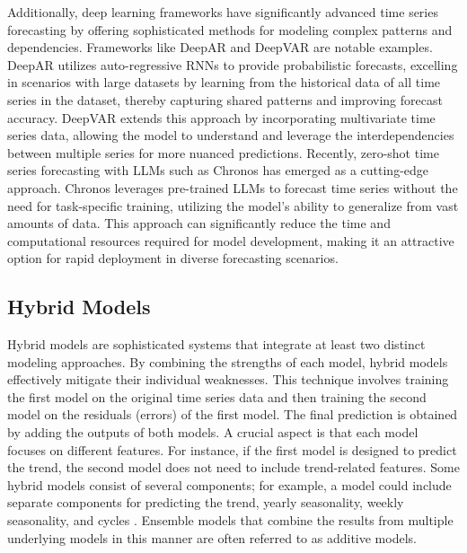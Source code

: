 Additionally, deep learning frameworks have significantly advanced time series
forecasting by offering sophisticated methods for modeling complex patterns and
dependencies. Frameworks like DeepAR \parencite{salinas2020deepar} and DeepVAR
\parencite{cheng2020deepvar} are notable examples. DeepAR utilizes auto-regressive
\ac{RNNs} to provide probabilistic forecasts, excelling in
scenarios with large datasets by learning from the historical data of all time
series in the dataset, thereby capturing shared patterns and improving forecast
accuracy. DeepVAR extends this approach by incorporating multivariate time series
data, allowing the model to understand and leverage the interdependencies between
multiple series for more nuanced predictions. Recently, zero-shot time series
forecasting with \ac{LLM}s such as Chronos \parencite{ansari2024chronos} has
emerged as a cutting-edge approach. Chronos leverages pre-trained \ac{LLM}s to
forecast time series without the need for task-specific training, utilizing the
model's ability to generalize from vast amounts of data. This approach can
significantly reduce the time and computational resources required for model
development, making it an attractive option for rapid deployment in diverse
forecasting scenarios.

\subsection*{Hybrid Models}
Hybrid models are sophisticated systems that integrate at least two distinct modeling approaches.
By combining the strengths of each model, hybrid models effectively mitigate their individual
weaknesses. This technique involves training the first model on the original time series data
and then training the second model on the residuals (errors) of the first model. The final
prediction is obtained by adding the outputs of both models. A crucial aspect is that each
model focuses on different features. For instance, if the first model is designed to predict
the trend, the second model does not need to include trend-related features. Some hybrid
models consist of several components; for example, a model could include separate components
for predicting the trend, yearly seasonality, weekly seasonality, and cycles
\parencite{zunic2020application}. Ensemble models that combine the results from
multiple underlying models in this manner are often referred to as additive models.

